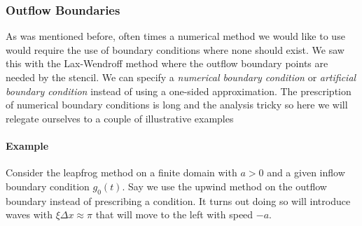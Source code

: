 \documentclass[11pt]{article}
\begin{document}
    \hypertarget{outflow-boundaries}{%
\subsubsection{Outflow Boundaries}\label{outflow-boundaries}}

As was mentioned before, often times a numerical method we would like to
use would require the use of boundary conditions where none should
exist. We saw this with the Lax-Wendroff method where the outflow
boundary points are needed by the stencil. We can specify a
\emph{numerical boundary condition} or \emph{artificial boundary
condition} instead of using a one-sided approximation. The prescription
of numerical boundary conditions is long and the analysis tricky so here
we will relegate ourselves to a couple of illustrative examples

    \hypertarget{example}{%
\paragraph{Example}\label{example}}

Consider the leapfrog method on a finite domain with \(a > 0\) and a
given inflow boundary condition \(g_0(t)\). Say we use the upwind method
on the outflow boundary instead of prescribing a condition. It turns out
doing so will introduce waves with \(\xi \Delta x \approx \pi\) that
will move to the left with speed \(-a\).
\end{document}

